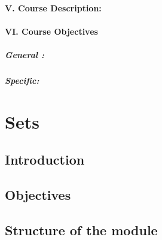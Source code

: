 \documentclass[]{book}
\let\oldparagraph\paragraph
\renewcommand{\paragraph}[1]{\oldparagraph{#1}\mbox{}}
\theoremstyle{definition}
\theoremstyle{definition}
\theoremstyle{definition}
\theoremstyle{remark}
\begin{document}
\hypertarget{v.-course-description}{%
\subsubsection*{V. Course Description:}\label{v.-course-description}}

\hypertarget{vi.-course-objectives}{%
\subsubsection*{VI. Course Objectives}\label{vi.-course-objectives}}

\hypertarget{general}{%
\paragraph{General :}\label{general}}

\hypertarget{specific}{%
\paragraph{Specific:}\label{specific}}

\hypertarget{sets}{%
\chapter{Sets}\label{sets}}

\hypertarget{introduction}{%
\section*{Introduction}\label{introduction}}

\hypertarget{objectives}{%
\section*{Objectives}\label{objectives}}

\hypertarget{structure-of-the-module}{%
\section*{Structure of the module}\label{structure-of-the-module}}
\end{document}
